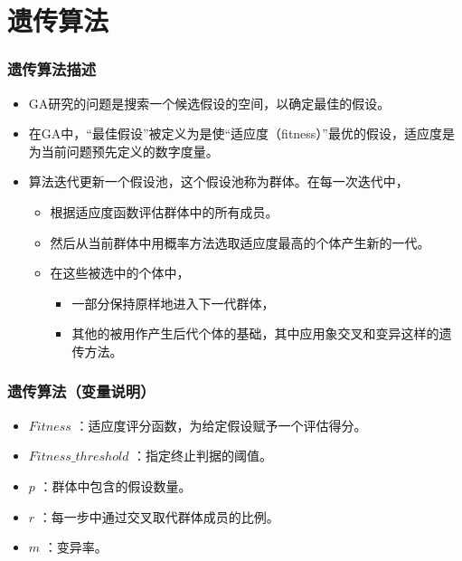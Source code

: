 \documentclass{beamer}
\begin{document}
\section{遗传算法}
\label{sec-3}
\begin{frame}
\frametitle{遗传算法描述}
\label{sec-3-1}

\begin{itemize}
\item GA研究的问题是搜索一个候选假设的空间，以确定最佳的假设。
\item 在GA中，“最佳假设”被定义为是使“适应度（fitness）”最优的假设，适应度是为当前问题预先定义的数字度量。
\item 算法迭代更新一个假设池，这个假设池称为群体。在每一次迭代中，
\begin{itemize}
\item 根据适应度函数评估群体中的所有成员。
\item 然后从当前群体中用概率方法选取适应度最高的个体产生新的一代。
\item 在这些被选中的个体中，
\begin{itemize}
\item 一部分保持原样地进入下一代群体，
\item 其他的被用作产生后代个体的基础，其中应用象交叉和变异这样的遗传方法。
\end{itemize}
\end{itemize}
\end{itemize}
\end{frame}
\begin{frame}
\frametitle{遗传算法（变量说明）}
\label{sec-3-2}

\begin{itemize}
\item $Fitness$ ：适应度评分函数，为给定假设赋予一个评估得分。
\item $Fitness\_threshold$ ：指定终止判据的阈值。
\item $p$ ：群体中包含的假设数量。
\item $r$ ：每一步中通过交叉取代群体成员的比例。
\item $m$ ：变异率。
\end{itemize}
\end{frame}
\end{document}
